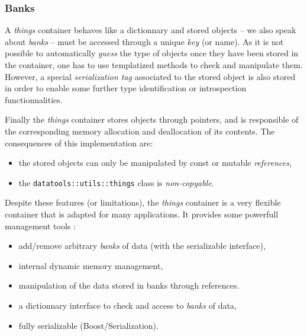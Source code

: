 \subsubsection{Banks}

A  \emph{things}  container  behaves  like a  dictionnary  and  stored
objects  -- we  also  speak  about \emph{banks}  --  must be  accessed
through  a unique  \emph{key}  (or name).  As  it is  not possible  to
automatically  \emph{guess} the type  of objects  once they  have been
stored in the  container, one has to use  templatized methods to check
and  manipulate  them.  However,  a special  \emph{serialization  tag}
associated to the stored object is also stored in order to enable some
further type identification or introspection functionnalities.

Finally the  \emph{things} container stores  objects through pointers,
and  is  responsible  of   the  corresponding  memory  allocation  and
deallocation of its contents.  The consequences of this implementation
are:
\begin{itemize}

\item the stored  objects can only be manipulated  by const or mutable
  \emph{references},

\item      the     \texttt{datatools::utils::things}      class     is
  \emph{non-copyable}.

\end{itemize}

\pn Despite these features (or limitations), the  \emph{things} container
is a very flexible container that is adapted for many applications.
It provides some powerfull management tools :
\begin{itemize}

\item add/remove arbitrary \emph{banks} of data 
  (with the serializable interface),

\item internal dynamic memory management,

\item manipulation of the data stored in banks through references.

\item a dictionnary interface to check and access to \emph{banks} of data,

\item fully serializable (Boost/Serialization).

\end{itemize}


